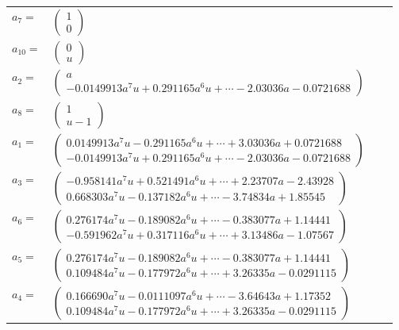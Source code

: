 \documentclass[1p]{elsarticle_modified}
\theoremstyle{definition}
\begin{document}
\begin{tabular}{m{7pt} m{180pt} m{7pt} m{180pt} }
\flushright $a_{7}=$&$\begin{pmatrix}1\\0\end{pmatrix}$ \\
\flushright $a_{10}=$&$\begin{pmatrix}0\\u\end{pmatrix}$ \\
\flushright $a_{2}=$&$\begin{pmatrix}a\\-0.0149913 a^{7} u+0.291165 a^{6} u+\cdots-2.03036 a-0.0721688\end{pmatrix}$ \\
\flushright $a_{8}=$&$\begin{pmatrix}1\\u-1\end{pmatrix}$ \\
\flushright $a_{1}=$&$\begin{pmatrix}0.0149913 a^{7} u-0.291165 a^{6} u+\cdots+3.03036 a+0.0721688\\-0.0149913 a^{7} u+0.291165 a^{6} u+\cdots-2.03036 a-0.0721688\end{pmatrix}$ \\
\flushright $a_{3}=$&$\begin{pmatrix}-0.958141 a^{7} u+0.521491 a^{6} u+\cdots+2.23707 a-2.43928\\0.668303 a^{7} u-0.137182 a^{6} u+\cdots-3.74834 a+1.85545\end{pmatrix}$ \\
\flushright $a_{6}=$&$\begin{pmatrix}0.276174 a^{7} u-0.189082 a^{6} u+\cdots-0.383077 a+1.14441\\-0.591962 a^{7} u+0.317116 a^{6} u+\cdots+3.13486 a-1.07567\end{pmatrix}$ \\
\flushright $a_{5}=$&$\begin{pmatrix}0.276174 a^{7} u-0.189082 a^{6} u+\cdots-0.383077 a+1.14441\\0.109484 a^{7} u-0.177972 a^{6} u+\cdots+3.26335 a-0.0291115\end{pmatrix}$ \\
\flushright $a_{4}=$&$\begin{pmatrix}0.166690 a^{7} u-0.0111097 a^{6} u+\cdots-3.64643 a+1.17352\\0.109484 a^{7} u-0.177972 a^{6} u+\cdots+3.26335 a-0.0291115\end{pmatrix}$ \\

\end{tabular}
\end{document}
